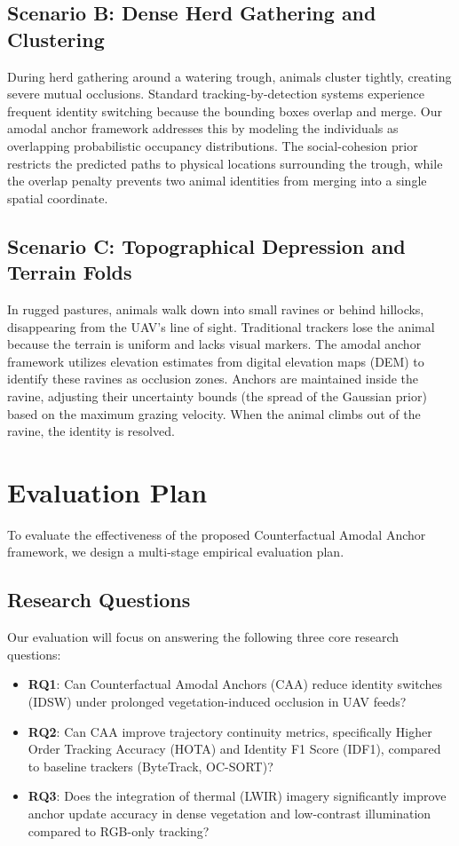 \documentclass[10pt,conference,letterpaper,twocolumn]{article}
\begin{document}
\subsection{Scenario B: Dense Herd Gathering and Clustering}
During herd gathering around a watering trough, animals cluster tightly, creating severe mutual occlusions. Standard tracking-by-detection systems experience frequent identity switching because the bounding boxes overlap and merge. Our amodal anchor framework addresses this by modeling the individuals as overlapping probabilistic occupancy distributions. The social-cohesion prior restricts the predicted paths to physical locations surrounding the trough, while the overlap penalty prevents two animal identities from merging into a single spatial coordinate.

\subsection{Scenario C: Topographical Depression and Terrain Folds}
In rugged pastures, animals walk down into small ravines or behind hillocks, disappearing from the UAV's line of sight. Traditional trackers lose the animal because the terrain is uniform and lacks visual markers. The amodal anchor framework utilizes elevation estimates from digital elevation maps (DEM) to identify these ravines as occlusion zones. Anchors are maintained inside the ravine, adjusting their uncertainty bounds (the spread of the Gaussian prior) based on the maximum grazing velocity. When the animal climbs out of the ravine, the identity is resolved.

\section{Evaluation Plan}
To evaluate the effectiveness of the proposed Counterfactual Amodal Anchor framework, we design a multi-stage empirical evaluation plan.

\subsection{Research Questions}
Our evaluation will focus on answering the following three core research questions:
\begin{itemize}
    \item \textbf{RQ1}: Can Counterfactual Amodal Anchors (CAA) reduce identity switches (IDSW) under prolonged vegetation-induced occlusion in UAV feeds?
    \item \textbf{RQ2}: Can CAA improve trajectory continuity metrics, specifically Higher Order Tracking Accuracy (HOTA) and Identity F1 Score (IDF1), compared to baseline trackers (ByteTrack, OC-SORT)?
    \item \textbf{RQ3}: Does the integration of thermal (LWIR) imagery significantly improve anchor update accuracy in dense vegetation and low-contrast illumination compared to RGB-only tracking?
\end{itemize}
\end{document}
